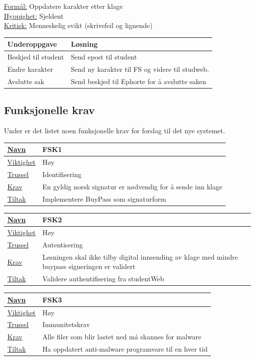\documentclass[12pt]{article}
\begin{document}
\underline{Formål:} Oppdatere karakter etter klage\\
\underline{Hyppighet:} Sjeldent\\
\underline{Kritisk:} Menneskelig svikt (skrivefeil og lignende)

\begin{tabularx}{\textwidth}{|l|X|}
  \hline
  Underoppgave & Løsning \\ \hline
  Beskjed til student & Send epost til student \\ \hline
  Endre karakter & Send ny karakter til FS og videre til studweb. \\ \hline
  Avslutte sak & Send beskjed til Ephorte for å avslutte saken \\ \hline
\end{tabularx}


\subsection{Funksjonelle krav}

Under er det listet noen funksjonelle krav for forslag til det nye systemet. 

\begin{tabularx}{\textwidth}{|l|X|}
  \hline
  \underline{Navn} & FSK1 \\ \hline
  \underline{Viktighet} & Høy \\ \hline
  \underline{Trussel} & Identifisering \\ \hline
  \underline{Krav} & En gyldig norsk signatur er nødvendig for å sende inn klage \\ \hline
  \underline{Tiltak} & Implementere BuyPass som signaturform \\ \hline
\end{tabularx}

\begin{tabularx}{\textwidth}{|l|X|}
  \hline
  \underline{Navn} & FSK2 \\ \hline
  \underline{Viktighet} & Høy \\ \hline
  \underline{Trussel} & Autentisering \\ \hline
  \underline{Krav} & Løsningen skal ikke tilby digital innsending av klage med mindre buypass signeringen er validert \\ \hline
  \underline{Tiltak} & Validere authentifisering fra studentWeb \\ \hline
\end{tabularx}

\begin{tabularx}{\textwidth}{|l|X|}
  \hline
  \underline{Navn} & FSK3 \\ \hline
  \underline{Viktighet} & Høy \\ \hline
  \underline{Trussel} & Immunitetskrav \\ \hline
  \underline{Krav} & Alle filer som blir lastet ned må skannes for malware \\ \hline
  \underline{Tiltak} & Ha oppdatert anti-malware programvare til en hver tid \\ \hline
\end{tabularx}
\end{document}
